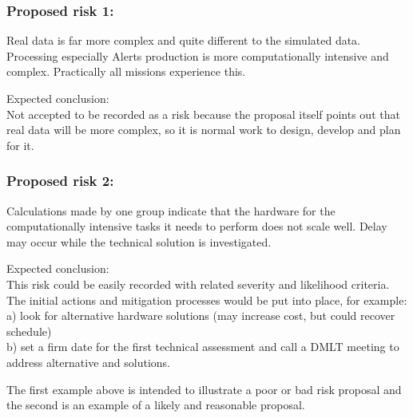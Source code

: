 \subsubsection*{Proposed risk 1:}

Real data is far more complex and quite different to the simulated data. Processing especially Alerts production is more computationally intensive and complex.
Practically all missions experience this.	

Expected conclusion:\\
Not accepted to be recorded as a risk because the proposal itself points out that real data will be more complex, so it is normal work to design, develop and plan for it.	

\subsubsection*{Proposed risk 2:}

Calculations made by  one group indicate that the hardware for the computationally intensive tasks it needs to perform does not scale well. Delay may occur while the technical solution is investigated.	
	
Expected conclusion:\\
This risk could be easily recorded with related severity and likelihood criteria. The initial actions and mitigation processes would be put into place,  for example: \\
a)	look for alternative hardware solutions (may increase cost, but could recover schedule)\\
b)	set a firm date for the first technical assessment and call a DMLT meeting to address alternative and solutions.	

The first example above is intended to illustrate a poor or bad risk proposal and the second is an example of a likely and reasonable proposal.

